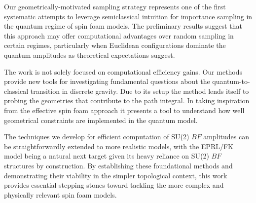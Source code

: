 Our geometrically-motivated sampling strategy represents one of the first
systematic attempts to leverage semiclassical intuition for importance sampling
in the quantum regime of spin foam models. The preliminary results suggest that
this approach may offer computational advantages over random sampling in
certain regimes, particularly when Euclidean configurations dominate
the quantum amplitudes as theoretical expectations suggest.  

The work is not solely focused on computational efficiency gains. Our methods
provide new tools for investigating fundamental questions about the
quantum-to-classical transition in discrete gravity. Due to its setup the
method lends itself to probing the geometries that contribute to the path
integral. In taking inspiration from the effective spin foam approach it
presents a tool to understand how well geometrical constraints are implemented
in the quantum model.  

The techniques we develop for efficient computation of SU(2) $BF$ amplitudes can
be straightforwardly extended to more realistic models, with the EPRL/FK model
being a natural next target given its heavy reliance on SU(2) $BF$ structures
by construction. By
establishing these foundational methods and demonstrating their viability in
the simpler topological context, this work provides essential stepping stones
toward tackling the more complex and physically relevant spin foam models. 





